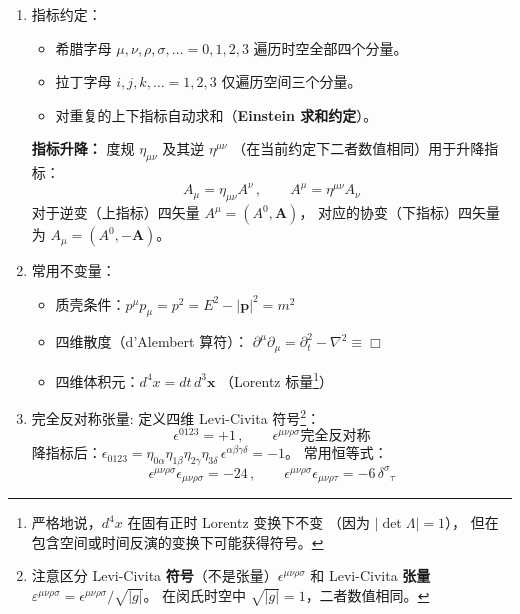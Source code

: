 \begin{enumerate}
\begin{itemize}
            \item $ds^2 = 0$：\textbf{类光}（lightlike / null）——
                  光信号恰好连接两个事件
          \end{itemize}
    \item 指标约定：
          \begin{itemize}
            \item 希腊字母 $\mu, \nu, \rho, \sigma, \ldots = 0, 1, 2, 3$ 遍历时空全部四个分量。
            \item 拉丁字母 $i, j, k, \ldots = 1, 2, 3$ 仅遍历空间三个分量。
            \item 对重复的上下指标自动求和（\textbf{Einstein 求和约定}）。
          \end{itemize}

          \noindent\textbf{指标升降：} 度规 $\eta_{\mu\nu}$ 及其逆 $\eta^{\mu\nu}$
          （在当前约定下二者数值相同）用于升降指标：
          \begin{equation}
            A_\mu = \eta_{\mu\nu}A^\nu\,,\qquad A^\mu = \eta^{\mu\nu}A_\nu
          \end{equation}
          对于逆变（上指标）四矢量 $A^\mu = (A^0, \mathbf{A})$，
          对应的协变（下指标）四矢量为 $A_\mu = (A^0, -\mathbf{A})$。
    \item 常用不变量：
      \begin{itemize}
    \item 质壳条件：$p^\mu p_\mu = p^2 = E^2 - |\mathbf{p}|^2 = m^2$
    \item 四维散度（d'Alembert 算符）：
          $\partial^\mu\partial_\mu
          = \partial_t^2 - \nabla^2
          \equiv \Box$
    \item 四维体积元：$d^4x = dt\,d^3\mathbf{x}$
          （Lorentz 标量\footnote{
          严格地说，$d^4x$ 在固有正时 Lorentz 变换下不变
          （因为 $|\det\Lambda| = 1$），
          但在包含空间或时间反演的变换下可能获得符号。}）
      \end{itemize}
    \item 完全反对称张量:
    定义四维 Levi-Civita 符号\footnote{
    注意区分 Levi-Civita \textbf{符号}（不是张量）$\epsilon^{\mu\nu\rho\sigma}$
    和 Levi-Civita \textbf{张量}
    $\varepsilon^{\mu\nu\rho\sigma} = \epsilon^{\mu\nu\rho\sigma}/\sqrt{|g|}$。
      在闵氏时空中 $\sqrt{|g|} = 1$，二者数值相同。
    }：
    \begin{equation}
  \epsilon^{0123} = +1\,,\qquad
  \epsilon^{\mu\nu\rho\sigma}\text{完全反对称}
    \end{equation}
    降指标后：$\epsilon_{0123} = \eta_{0\alpha}\eta_{1\beta}\eta_{2\gamma}\eta_{3\delta}
      \,\epsilon^{\alpha\beta\gamma\delta} = -1$。
常用恒等式：
    \begin{equation}
  \epsilon^{\mu\nu\rho\sigma}\epsilon_{\mu\nu\rho\sigma} = -24\,,\qquad
  \epsilon^{\mu\nu\rho\sigma}\epsilon_{\mu\nu\rho\tau} = -6\,\delta^\sigma{}_\tau
    \end{equation}
\end{enumerate}
